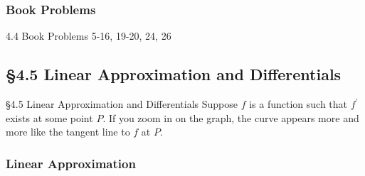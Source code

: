 \documentclass[cal1spr16Lectures.tex]{subfiles}
\begin{document}
\subsubsection{Book Problems}

\begin{frame}
\begin{block}{4.4 Book Problems}
5-16, 19-20, 24, 26 
\end{block}
\end{frame}

\subsection[4.5 Linear Approximation and Differentials]{\S 4.5 Linear Approximation and Differentials}

\begin{frame}{\S 4.5 Linear Approximation and Differentials}
\footnotesize
Suppose $f$ is a function such that $f^{\prime}$ exists at some point $P$.  If you zoom in on the graph, the curve appears more and more like the tangent line to $f$ at $P$.  

\end{frame}

\subsubsection{Linear Approximation}
\end{document}
